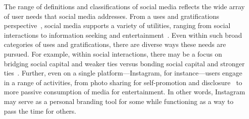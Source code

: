 
The range of definitions and classifications of social media reflects the wide array of user needs that social media addresses. From a uses and gratifications perspective~\cite{GurevitchKatz-1973-UsesGratificationsResearch-y}, social media supports a variety of utilities, ranging from social interactions to information seeking and entertainment~\cite{whiting2013people}. Even within such broad categories of uses and gratifications, there are diverse ways these needs are pursued. For example, within social interactions, there may be a focus on bridging social capital and weaker ties versus bonding social capital and stronger ties~\cite{phua_uses_2017}. Further, even on a single platform---Instagram, for instance---users engage in a range of activities, from photo sharing for self-promotion and disclosure~\cite{Menon-2022-UsesGratificationsInstagram-x} to more passive consumption of media for entertainment. In other words, Instagram may serve as a personal branding tool for some while functioning as a way to pass the time for others.

